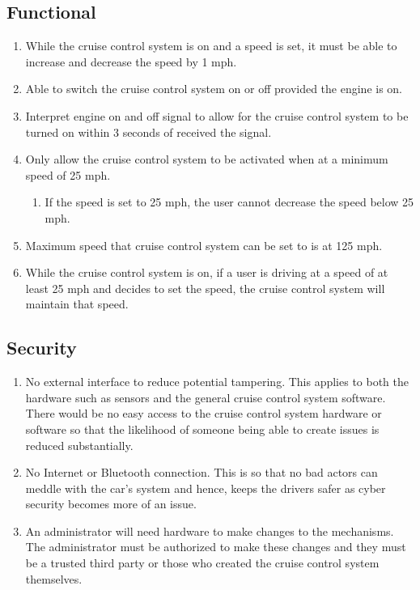 \documentclass[preprint,11pt,3p]{article}
\begin{document}
\subsection{Functional}
\begin{enumerate}
	\item While the cruise control system is on and a speed is set, it must be able to increase and decrease the speed by 1 mph.
	\item Able to switch the cruise control system on or off provided the engine is on.
	\item Interpret engine on and off signal to allow for the cruise control system to be turned on within 3 seconds of received the signal.
	\item Only allow the cruise control system to be activated when at a minimum speed of 25 mph. 
		\begin{enumerate}
			\item If the speed is set to 25 mph, the user cannot decrease the speed below 25 mph.
		\end{enumerate}%
	\item Maximum speed that cruise control system can be set to is at 125 mph.
	\item While the cruise control system is on, if a user is driving at a speed of at least 25 mph and decides to set the speed, the cruise control system will maintain that speed.
\end{enumerate}

\subsection{Security}
\begin{enumerate}
	\item No external interface to reduce potential tampering. This applies to both the hardware such as sensors and the general cruise control system software. There would be no easy access to the cruise control system hardware or software so that the likelihood of someone being able to create issues is reduced substantially. 
	\item No Internet or Bluetooth connection. This is so that no bad actors can meddle with the car's system and hence, keeps the drivers safer as cyber security becomes more of an issue.
	\item An administrator will need hardware to make changes to the mechanisms. The administrator must be authorized to make these changes and they must be a trusted third party or those who created the cruise control system themselves. 
\end{enumerate}
\end{document}
